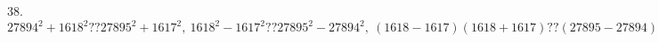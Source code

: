 38. $27894^2+1618^2??27895^2+1617^2,\ 1618^2-1617^2??27895^2-27894^2,\ (1618-1617)(1618+1617)??(27895-27894)(27895+27894),\ 1618+1617<27895+27894.$\\
